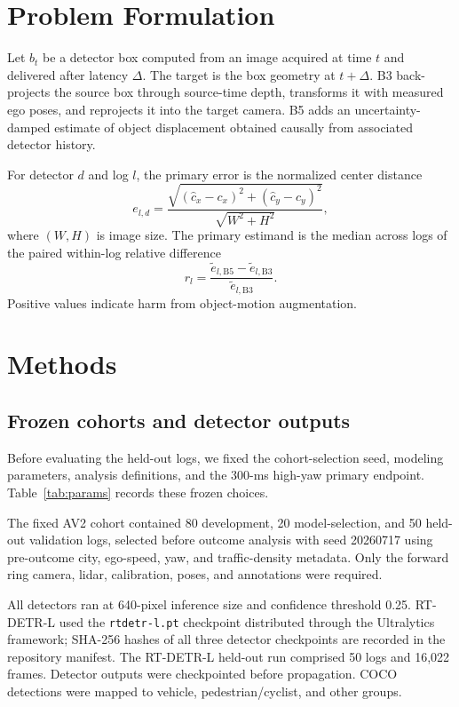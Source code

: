 \documentclass[journal]{IEEEtran}
\begin{document}
\section{Problem Formulation}
Let $b_t$ be a detector box computed from an image acquired at time $t$ and delivered after latency $\Delta$. The target is the box geometry at $t+\Delta$. B3 back-projects the source box through source-time depth, transforms it with measured ego poses, and reprojects it into the target camera. B5 adds an uncertainty-damped estimate of object displacement obtained causally from associated detector history.

For detector $d$ and log $l$, the primary error is the normalized center distance
\begin{equation}
 e_{l,d}=\frac{\sqrt{(\hat c_x-c_x)^2+(\hat c_y-c_y)^2}}
 {\sqrt{W^2+H^2}},
\end{equation}
where $(W,H)$ is image size. The primary estimand is the median across logs of the paired within-log relative difference
\begin{equation}
 r_l=\frac{\widetilde e_{l,\mathrm{B5}}-\widetilde e_{l,\mathrm{B3}}}
 {\widetilde e_{l,\mathrm{B3}}}.
\end{equation}
Positive values indicate harm from object-motion augmentation.

\section{Methods}
\subsection{Frozen cohorts and detector outputs}

Before evaluating the held-out logs, we fixed the cohort-selection seed, modeling parameters, analysis definitions, and the 300-ms high-yaw primary endpoint. Table~\ref{tab:params} records these frozen choices.

The fixed AV2 cohort contained 80 development, 20 model-selection, and 50 held-out validation logs, selected before outcome analysis with seed 20260717 using pre-outcome city, ego-speed, yaw, and traffic-density metadata. Only the forward ring camera, lidar, calibration, poses, and annotations were required.

All detectors ran at 640-pixel inference size and confidence threshold 0.25. RT-DETR-L used the \texttt{rtdetr-l.pt} checkpoint distributed through the Ultralytics framework; SHA-256 hashes of all three detector checkpoints are recorded in the repository manifest. The RT-DETR-L held-out run comprised 50 logs and 16,022 frames. Detector outputs were checkpointed before propagation. COCO detections were mapped to vehicle, pedestrian/cyclist, and other groups.
\end{document}
